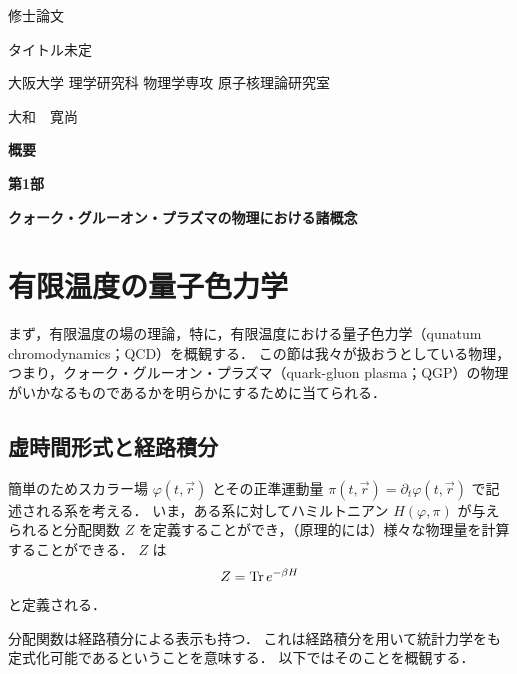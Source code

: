 \documentclass[dvipdfmx, a4paper]{jarticle}
\numberwithin{equation}{section}
\begin{document}
\centerline{{\large 修士論文}}
\bigskip
\centerline{{\LARGE タイトル未定}}
\vfill
\centerline{{\large 大阪大学\,\,理学研究科\,\,物理学専攻\,\,原子核理論研究室}}
\smallskip
\centerline{{\large 大和　寛尚}}
\pagestyle{empty}
\newpage

\vbox{}
\vfill
\centerline{\Large \textbf{概要}}
\vbox{}
\vfill

\newpage
\tableofcontents


\newpage
\vfill
\centerline{\LARGE \textbf{第1部}}
\bigskip
\centerline{\LARGE \textbf{クォーク・グルーオン・プラズマの物理における諸概念}}
\vfill
{}

\newpage
\section{有限温度の量子色力学}
まず，有限温度の場の理論，特に，有限温度における量子色力学（qunatum chromodynamics；QCD）を概観する．
この節は我々が扱おうとしている物理，つまり，クォーク・グルーオン・プラズマ（quark-gluon plasma；QGP）の物理がいかなるものであるかを明らかにするために当てられる．

\subsection{虚時間形式と経路積分}
簡単のためスカラー場 $\varphi(t, \vec{r})$ とその正準運動量 $\pi(t, \vec{r}) = \partial_t \varphi(t, \vec{r})$ で記述される系を考える．
いま，ある系に対してハミルトニアン $H(\varphi, \pi)$ が与えられると分配関数 $Z$ を定義することができ，（原理的には）様々な物理量を計算することができる．
$Z$ は
\begin{align}
  Z = \Tr e^{-\beta H} \label{def:pf}
\end{align}
と定義される．

分配関数は経路積分による表示も持つ．
これは経路積分を用いて統計力学をも定式化可能であるということを意味する．
以下ではそのことを概観する．
\end{document}
